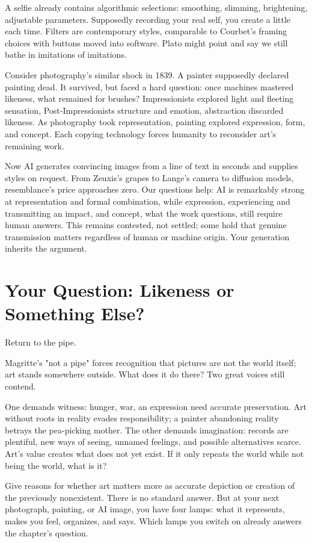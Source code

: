 A selfie already contains algorithmic selections: smoothing, slimming, brightening, adjustable parameters. Supposedly recording your real self, you create a little each time. Filters are contemporary styles, comparable to Courbet's framing choices with buttons moved into software. Plato might point and say we still bathe in imitations of imitations.

Consider photography's similar shock in 1839. A painter supposedly declared painting dead. It survived, but faced a hard question: once machines mastered likeness, what remained for brushes? Impressionists explored light and fleeting sensation, Post-Impressionists structure and emotion, abstraction discarded likeness. As photography took representation, painting explored expression, form, and concept. Each copying technology forces humanity to reconsider art's remaining work.

Now AI generates convincing images from a line of text in seconds and supplies styles on request. From Zeuxis's grapes to Lange's camera to diffusion models, resemblance's price approaches zero. Our questions help: AI is remarkably strong at representation and formal combination, while expression, experiencing and transmitting an impact, and concept, what the work questions, still require human answers. This remains contested, not settled; some hold that genuine transmission matters regardless of human or machine origin. Your generation inherits the argument.

\section{Your Question: Likeness or Something Else?}
Return to the pipe.

Magritte's "not a pipe" forces recognition that pictures are not the world itself; art stands somewhere outside. What does it do there? Two great voices still contend.

One demands witness: hunger, war, an expression need accurate preservation. Art without roots in reality evades responsibility; a painter abandoning reality betrays the pea-picking mother. The other demands imagination: records are plentiful, new ways of seeing, unnamed feelings, and possible alternatives scarce. Art's value creates what does not yet exist. If it only repeats the world while not being the world, what is it?

Give reasons for whether art matters more as accurate depiction or creation of the previously nonexistent. There is no standard answer. But at your next photograph, painting, or AI image, you have four lamps: what it represents, makes you feel, organizes, and says. Which lamps you switch on already answers the chapter's question.
